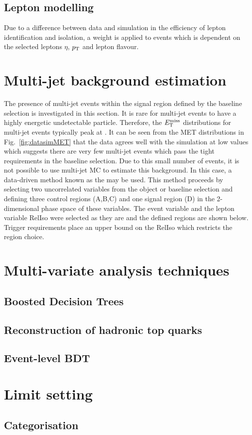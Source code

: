 \subsection{Lepton modelling}
Due to a difference between data and simulation in the efficiency of lepton identification and isolation, a weight is applied to events which is dependent on the selected leptons $\eta$, $p_{\mathrm{T}}$ and lepton flavour.

\section{Multi-jet background estimation}
\label{sec:QCDbackground}
The presence of multi-jet events within the signal region defined by the baseline selection is investigated in this section. It is rare for multi-jet events to have a highly energetic undetectable particle. Therefore, the $E_{\mathrm{T}}^{\text{miss}}$ distributions for multi-jet events typically peak at . It can be seen from the MET distributions in Fig.~\ref{fig:datasimMET} that the data agrees well with the simulation at low values which suggests there are very few multi-jet events which pass the tight requirements in the baseline selection. Due to this small number of events, it is not possible to use multi-jet MC to estimate this background. In this case, a data-driven method known as the  may be used. This method proceeds by selecting two uncorrelated variables from the object or baseline selection and defining three control regions (A,B,C) and one signal region (D) in the 2-dimensional phase space of these variables. The event variable \MET and the lepton variable RelIso were selected as they are  and the defined regions are shown below. Trigger requirements place an upper bound on the RelIso which restricts the region choice.\\











\section{Multi-variate analysis techniques}
\subsection{Boosted Decision Trees}
\label{sec:BDT}


\subsection{Reconstruction of hadronic top quarks}

\subsection{Event-level BDT}

\section{Limit setting}

\subsection{Categorisation}
\label{sec:Categorisation}




